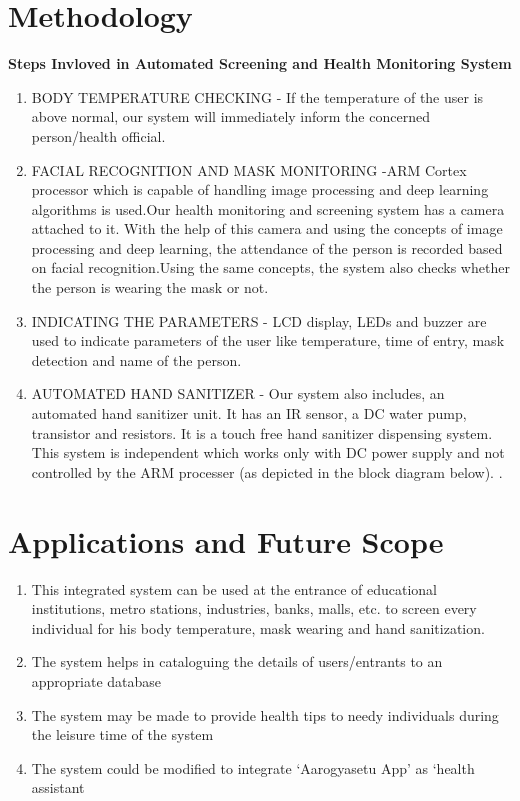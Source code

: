 \section{Methodology}
\begin{flushleft}
	\textbf{Steps Invloved in Automated Screening and Health Monitoring System} \begin{enumerate}
		\item BODY TEMPERATURE CHECKING - If the temperature of the user is above normal, our system will immediately inform the concerned person/health official.
 
	\item FACIAL RECOGNITION AND MASK MONITORING -ARM Cortex processor which is capable of handling image processing and deep learning algorithms is used.Our health monitoring and screening system has a camera attached to it. With the help of this camera and using the concepts of image processing and deep learning, the attendance of the person is recorded based on facial recognition.Using the same concepts, the system also checks whether the person is wearing the mask or not.

	\item INDICATING THE PARAMETERS - LCD display, LEDs and buzzer are used to indicate parameters of the user like temperature, time of entry, mask detection and name of the person. 

	\item AUTOMATED HAND SANITIZER - Our system also includes, an automated hand sanitizer unit. It has an IR sensor, a DC water pump, transistor and resistors. It is a touch free hand sanitizer dispensing system. This system is independent which works only with DC power supply and not controlled by the ARM processer (as depicted in the block diagram below).
.\end{enumerate}  \end{flushleft}

\section{Applications and Future Scope}
\begin{enumerate}
	\item 	This integrated system can be used at the entrance of educational institutions, metro stations, industries, banks, malls, etc. to screen every individual for his body temperature, mask wearing and hand sanitization. \par 
	\item The system helps in cataloguing the details of users/entrants to an appropriate database \par
 \item 	The system may be made to provide health tips to needy individuals during the leisure time of the system \par
 \item 	The system could be modified to integrate ‘Aarogyasetu App’ as ‘health assistant \par
\end{enumerate}

